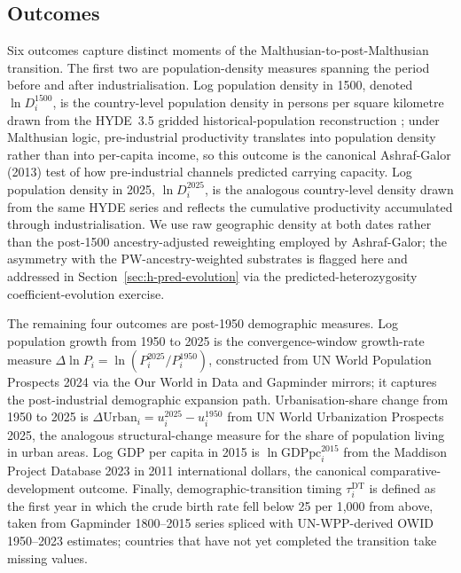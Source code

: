 \documentclass[11pt,letterpaper]{article}
\begin{document}
\subsection{Outcomes}
\label{sec:data-outcomes}

Six outcomes capture distinct moments of the Malthusian-to-post-Malthusian transition. The first two are population-density measures spanning the period before and after industrialisation. Log population density in 1500, denoted $\ln D_i^{1500}$, is the country-level population density in persons per square kilometre drawn from the HYDE~3.5 gridded historical-population reconstruction \citep{goldewijk2017}; under Malthusian logic, pre-industrial productivity translates into population density rather than into per-capita income, so this outcome is the canonical Ashraf-Galor (2013) test of how pre-industrial channels predicted carrying capacity. Log population density in 2025, $\ln D_i^{2025}$, is the analogous country-level density drawn from the same HYDE series and reflects the cumulative productivity accumulated through industrialisation. We use raw geographic density at both dates rather than the post-1500 ancestry-adjusted reweighting employed by Ashraf-Galor; the asymmetry with the PW-ancestry-weighted substrates is flagged here and addressed in Section~\ref{sec:h-pred-evolution} via the predicted-heterozygosity coefficient-evolution exercise.

The remaining four outcomes are post-1950 demographic measures. Log population growth from 1950 to 2025 is the convergence-window growth-rate measure $\Delta\ln P_i = \ln(P_i^{2025}/P_i^{1950})$, constructed from UN World Population Prospects 2024 via the Our World in Data and Gapminder mirrors; it captures the post-industrial demographic expansion path. Urbanisation-share change from 1950 to 2025 is $\Delta \text{Urban}_i = u_i^{2025} - u_i^{1950}$ from UN World Urbanization Prospects 2025, the analogous structural-change measure for the share of population living in urban areas. Log GDP per capita in 2015 is $\ln \text{GDPpc}_i^{2015}$ from the Maddison Project Database 2023 \citep{maddison2023} in 2011 international dollars, the canonical comparative-development outcome. Finally, demographic-transition timing $\tau_i^{\text{DT}}$ is defined as the first year in which the crude birth rate fell below 25 per 1{,}000 from above, taken from Gapminder 1800--2015 series spliced with UN-WPP-derived OWID 1950--2023 estimates; countries that have not yet completed the transition take missing values.
\end{document}

